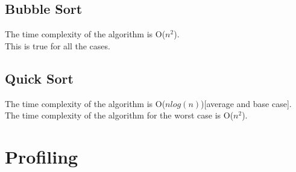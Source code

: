 \documentclass{article}
\begin{document}
\subsection{Bubble Sort}
The time complexity of the algorithm is O($n^2$).\\
This is true for all the cases.
\subsection{Quick Sort}
The time complexity of the algorithm is O($nlog(n)$)[average and base case].\\
The time complexity of the algorithm for the worst case is O($n^2$).
\section{Profiling}

%
%
%
%       
%
\end{document}

